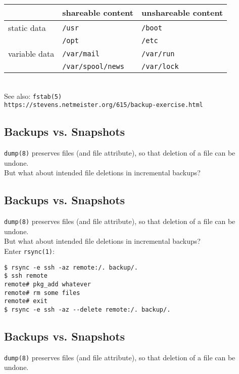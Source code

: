 \documentclass[xga]{xdvislides}
\begin{document}
\vspace{.5in}
\Huge
\begin{tabularx}{\textwidth}{X | X | X }
& shareable content & unshareable content \\
\hline
static data & {\tt /usr} & {\tt /boot} \\
& {\tt /opt} & {\tt /etc} \\
\hline
variable data & {\tt /var/mail} & {\tt /var/run} \\
& {\tt /var/spool/news} & {\tt /var/lock} \\
\end{tabularx}
\Normalsize
\\

See also: \verb+fstab(5)+ \\

\verb+https://stevens.netmeister.org/615/backup-exercise.html+

\subsection{Backups vs. Snapshots}
\verb+dump(8)+ preserves files (and file attribute),
so that deletion of a file can be undone. \\

But what about intended file deletions in incremental
backups?

\subsection{Backups vs. Snapshots}
\verb+dump(8)+ preserves files (and file attribute),
so that deletion of a file can be undone. \\

But what about intended file deletions in incremental
backups? \\

Enter \verb+rsync(1)+: \\

\begin{verbatim}
$ rsync -e ssh -az remote:/. backup/.
$ ssh remote
remote# pkg_add whatever
remote# rm some files
remote# exit
$ rsync -e ssh -az --delete remote:/. backup/.
\end{verbatim}

\subsection{Backups vs. Snapshots}
\verb+dump(8)+ preserves files (and file attribute),
so that deletion of a file can be undone. \\
\end{document}
